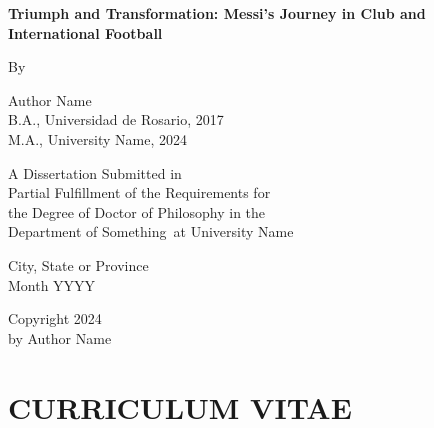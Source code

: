 \documentclass{report}
\newcommand{\university}{University Name}
\newcommand{\department}{Department of Something}
\begin{document}
\begin{titlepage}
    \begin{center}
        \vspace*{0.5cm}
        \linespread{1.3}
        
        \LARGE
        \textbf{Triumph and Transformation: Messi's Journey in Club and International Football}
        
        \vspace{2.5cm}
        
        \normalsize
        By
        
        \vspace{1cm}
        \large Author Name \\
        \vspace{0.25cm}
        \normalsize
        B.A., Universidad de Rosario, 2017 \\
        M.A., \university, 2024
            
        \vspace{3cm}
        \large

        A Dissertation Submitted in                           \\
        Partial Fulfillment of the Requirements for           \\
        the Degree of Doctor of Philosophy in the             \\
        \department\ at \university
            
        \vspace{4.5cm}
        
        City, State or Province \\
        Month YYYY
            
    \end{center}
\end{titlepage}

\newpage
{}
\begin{minipage}[b]{0.9\textwidth}\centering
\vspace{0.45\textheight}
\textcopyright{} Copyright 2024 \\
by Author Name
\end{minipage}

\newpage


\doublespacing
{}
\pagestyle{plain}
\setcounter{page}{4}

\chapter*{CURRICULUM VITAE}
\end{document}
